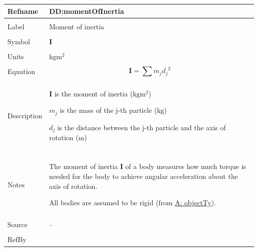 \documentclass[12pt]{article}
\begin{document}
\begin{minipage}{\textwidth}
\begin{tabular}{>{\raggedright}p{}>{\raggedright\arraybackslash}p{}}
\toprule \textbf{Refname} & \textbf{DD:momentOfInertia}
\label{DD:momentOfInertia}
\\ \midrule \\
Label & Moment of inertia
        
\\ \midrule \\
Symbol & $\mathbf{I}$
         
\\ \midrule \\
Units & $\text{kg}\text{m}^{2}$
        
\\ \midrule \\
Equation & \begin{displaymath}
           \mathbf{I}=\displaystyle\sum{{m_{j}} {d_{j}}^{2}}
           \end{displaymath}
\\ \midrule \\
Description & \begin{symbDescription}
              \item{$\mathbf{I}$ is the moment of inertia ($\text{kg}\text{m}^{2}$)}
              \item{${m_{j}}$ is the mass of the j-th particle (${\text{kg}}$)}
              \item{${d_{j}}$ is the distance between the j-th particle and the axis of rotation (${\text{m}}$)}
              \end{symbDescription}
\\ \midrule \\
Notes & The moment of inertia $\mathbf{I}$ of a body measures how much torque is needed for the body to achieve angular acceleration about the axis of rotation.
        
        All bodies are assumed to be rigid (from \hyperref[assumpOT]{A: objectTy}).
        
\\ \midrule \\
Source & --
         
\\ \midrule \\
RefBy & 
\\ \bottomrule
\end{tabular}
\end{minipage}
\end{document}

